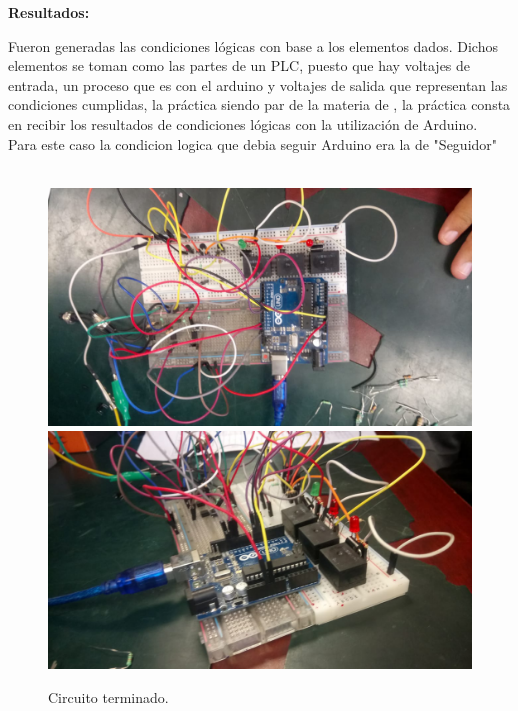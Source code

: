 \documentclass[letterpaper]{article}
\begin{document}
\newpage
\begin{huge}
    \textbf{Resultados:}\\
\end{huge}
Fueron generadas las condiciones lógicas con base a los elementos dados. Dichos elementos se toman como las partes de un PLC, puesto que hay voltajes de entrada, un proceso que es con el arduino y voltajes de salida que representan las condiciones cumplidas, la práctica siendo par de la materia de \color{cyan}{Controladores lógicos programables}\color{black}, la práctica consta en recibir los resultados de condiciones lógicas con la utilización de Arduino. %
 \\
 Para este caso la condicion logica que debia seguir Arduino era la de "Seguidor"\\\\
 \begin{figure}[htbp]
     \centering
     \includegraphics[scale=0.3]{IMG/CirTerm(1).jpeg}
     \includegraphics[scale=0.3]{IMG/CirTerm(2).jpeg}
     \caption{Circuito terminado.}
     \label{fig:CirTerm}
 \end{figure}\newpage
\end{document}
